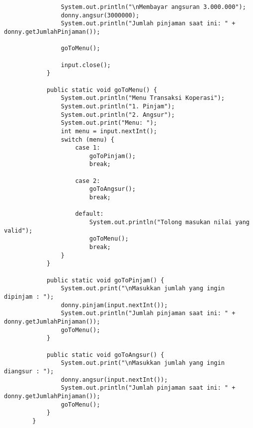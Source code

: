 \documentclass[12pt,titlepage]{article}
\begin{document}
\begin{enumerate}
\begin{verbatim}
                System.out.println("\nMembayar angsuran 3.000.000");
                donny.angsur(3000000);
                System.out.println("Jumlah pinjaman saat ini: " + donny.getJumlahPinjaman());

                goToMenu();

                input.close();
            }

            public static void goToMenu() {
                System.out.println("Menu Transaksi Koperasi");
                System.out.println("1. Pinjam");
                System.out.println("2. Angsur");
                System.out.print("Menu: ");
                int menu = input.nextInt();
                switch (menu) {
                    case 1:
                        goToPinjam();
                        break;
                    
                    case 2:
                        goToAngsur();
                        break;
                
                    default:
                        System.out.println("Tolong masukan nilai yang valid");
                        goToMenu();
                        break;
                }
            }

            public static void goToPinjam() {
                System.out.print("\nMasukkan jumlah yang ingin dipinjam : ");
                donny.pinjam(input.nextInt());
                System.out.println("Jumlah pinjaman saat ini: " + donny.getJumlahPinjaman());
                goToMenu();
            }

            public static void goToAngsur() {
                System.out.print("\nMasukkan jumlah yang ingin diangsur : ");
                donny.angsur(input.nextInt());
                System.out.println("Jumlah pinjaman saat ini: " + donny.getJumlahPinjaman());
                goToMenu();
            }
        }

    \end{verbatim}
\end{enumerate}
\end{document}

